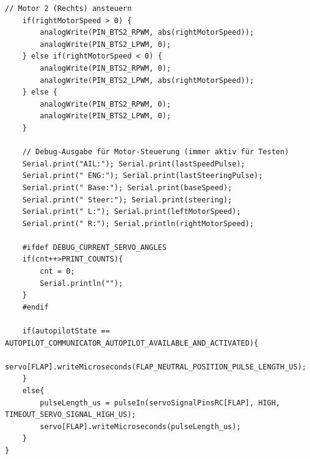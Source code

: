 \begin{lstlisting}[style=motorStyle, caption={Motorsteuerung: acutatorController.cpp}]
	// Motor 2 (Rechts) ansteuern
	if(rightMotorSpeed > 0) {
		analogWrite(PIN_BTS2_RPWM, abs(rightMotorSpeed));
		analogWrite(PIN_BTS2_LPWM, 0);
	} else if(rightMotorSpeed < 0) {
		analogWrite(PIN_BTS2_RPWM, 0);
		analogWrite(PIN_BTS2_LPWM, abs(rightMotorSpeed));
	} else {
		analogWrite(PIN_BTS2_RPWM, 0);
		analogWrite(PIN_BTS2_LPWM, 0);
	}
	
	// Debug-Ausgabe für Motor-Steuerung (immer aktiv für Testen)
	Serial.print("AIL:"); Serial.print(lastSpeedPulse);
	Serial.print(" ENG:"); Serial.print(lastSteeringPulse);
	Serial.print(" Base:"); Serial.print(baseSpeed);
	Serial.print(" Steer:"); Serial.print(steering);
	Serial.print(" L:"); Serial.print(leftMotorSpeed);
	Serial.print(" R:"); Serial.println(rightMotorSpeed);
	
	#ifdef DEBUG_CURRENT_SERVO_ANGLES
	if(cnt++>PRINT_COUNTS){
		cnt = 0;
		Serial.println("");
	} 
	#endif
	
	if(autopilotState == AUTOPILOT_COMMUNICATOR_AUTOPILOT_AVAILABLE_AND_ACTIVATED){
		servo[FLAP].writeMicroseconds(FLAP_NEUTRAL_POSITION_PULSE_LENGTH_US);
	}
	else{
		pulseLength_us = pulseIn(servoSignalPinsRC[FLAP], HIGH, TIMEOUT_SERVO_SIGNAL_HIGH_US);
		servo[FLAP].writeMicroseconds(pulseLength_us);
	}
}


\end{lstlisting}


